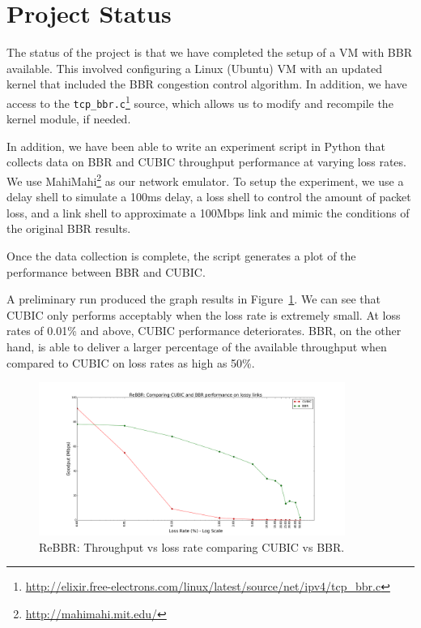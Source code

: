 
\section{Project Status}

The status of the project is that we have completed the setup of a VM with
BBR available. This involved configuring a Linux (Ubuntu) VM with an updated
kernel that included the BBR congestion control algorithm. In addition, we
have access to the \texttt{tcp\_bbr.c}\footnote{
\url{http://elixir.free-electrons.com/linux/latest/source/net/ipv4/tcp_bbr.c}}
source, which allows us to modify and recompile the kernel module, if needed.

In addition, we have been able to write an experiment script in Python that
collects data on BBR and CUBIC throughput performance at varying loss rates.
We use MahiMahi\footnote{\url{http://mahimahi.mit.edu/}} as our network
emulator. To setup the experiment, we use a delay shell to simulate a 100ms
delay, a loss shell to control the amount of packet loss, and a link
shell to approximate a 100Mbps link and mimic the conditions of the original
BBR results.

Once the data collection is complete, the script generates a plot of the
performance between BBR and CUBIC.

A preliminary run produced the graph results in Figure~\ref{fig:rebbr8}. We
can see that CUBIC only performs acceptably when the loss rate is extremely
small. At loss rates of 0.01\% and above, CUBIC performance deteriorates.
BBR, on the other hand, is able to deliver a larger percentage of the available
throughput when compared to CUBIC on loss rates as high as 50\%.


\begin{figure}[h]
  \centering
  \includegraphics[height=5cm]{./img/rebbr_fig8.png}
  \caption{ReBBR: Throughput vs loss rate comparing CUBIC vs BBR.}
  \label{fig:rebbr8}
\end{figure}


